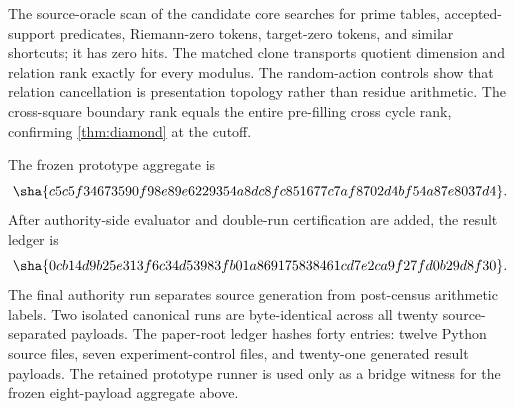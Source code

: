 The source-oracle scan of the candidate core searches for prime tables,
accepted-support predicates, Riemann-zero tokens, target-zero tokens, and
similar shortcuts; it has zero hits.  The matched clone transports quotient
dimension and relation rank exactly for every modulus.  The random-action
controls show that relation cancellation is presentation topology rather than
residue arithmetic.  The cross-square boundary rank equals the entire
pre-filling cross cycle rank, confirming \cref{thm:diamond} at the cutoff.

The frozen prototype aggregate is
\[
\sha{c5c5f34673590f98e89e6229354a8dc8fc851677c7af8702d4bf54a87e8037d4}.
\]
After authority-side evaluator and double-run certification are added, the
result ledger is
\[
\sha{0cb14d9b25e313f6c34d53983fb01a869175838461cd7e2ca9f27fd0b29d8f30}.
\]
The final authority run separates source generation from post-census
arithmetic labels.  Two isolated canonical runs are byte-identical across all
twenty source-separated payloads.  The paper-root ledger hashes forty entries:
twelve Python source files, seven experiment-control files, and twenty-one
generated result payloads.  The retained prototype runner is used only as a
bridge witness for the frozen eight-payload aggregate above.
